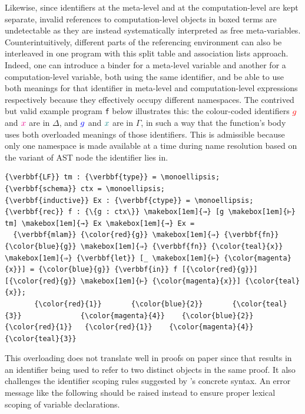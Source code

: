 Likewise, since identifiers at the meta-level and at the computation-level are kept separate, invalid references to computation-level objects in boxed terms are undetectable as they are instead systematically interpreted as free meta-variables.
Counterintuitively, different parts of the referencing environment can also be interleaved in one program with this split table and association lists approach.
Indeed, one can introduce a binder for a meta-level variable and another for a computation-level variable, both using the same identifier, and be able to use both meanings for that identifier in meta-level and computation-level expressions respectively because they effectively occupy different namespaces.
The contrived but valid example program \verb*|f| below illustrates this: the colour-coded identifiers ${\color{red}{g}}$ and ${\color{magenta}{x}}$ are in $\Delta$, and ${\color{blue}{g}}$ and ${\color{teal}{x}}$ are in $\Gamma$, in such a way that the function's body uses both overloaded meanings of those identifiers.
This is admissible because only one namespace is made available at a time during name resolution based on the variant of \ac{AST} node the identifier lies in.
\bigskip
\begin{Verbatim}[commandchars=\\\{\}, baselinestretch=1]
{\verbbf{LF}} tm : {\verbbf{type}} = \monoellipsis;
{\verbbf{schema}} ctx = \monoellipsis;
{\verbbf{inductive}} Ex : {\verbbf{ctype}} = \monoellipsis;
{\verbbf{rec}} f : {\{g : ctx\}} \makebox[1em]{→} [g \makebox[1em]{⊢} tm] \makebox[1em]{→} Ex \makebox[1em]{→} Ex =
  {\verbbf{mlam}} {\color{red}{g}} \makebox[1em]{⇒} {\verbbf{fn}} {\color{blue}{g}} \makebox[1em]{⇒} {\verbbf{fn}} {\color{teal}{x}} \makebox[1em]{⇒} {\verbbf{let}} [_ \makebox[1em]{⊢} {\color{magenta}{x}}] = {\color{blue}{g}} {\verbbf{in}} f [{\color{red}{g}}] [{\color{red}{g}} \makebox[1em]{⊢} {\color{magenta}{x}}] {\color{teal}{x}};
       {\color{red}{1}}       {\color{blue}{2}}       {\color{teal}{3}}              {\color{magenta}{4}}    {\color{blue}{2}}       {\color{red}{1}}   {\color{red}{1}}    {\color{magenta}{4}}  {\color{teal}{3}}
\end{Verbatim}
This overloading does not translate well in proofs on paper since that results in an identifier being used to refer to two distinct objects in the same proof.
It also challenges the identifier scoping rules suggested by \Beluga's concrete syntax.
An error message like the following should be raised instead to ensure proper lexical scoping of variable declarations.
\bigskip
\begingroup
\samepage

